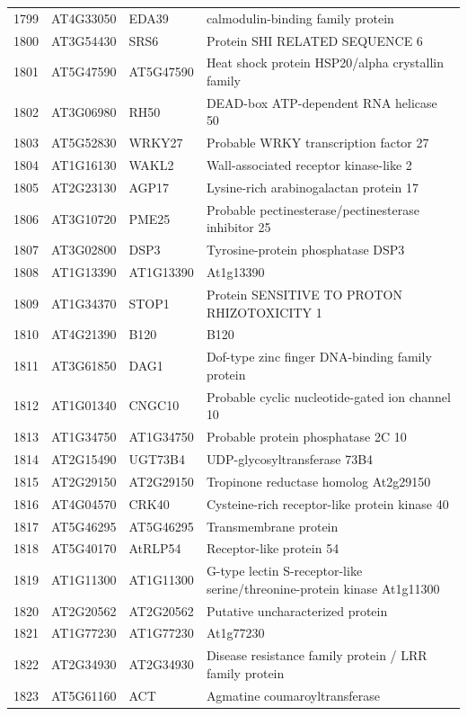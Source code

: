 \documentclass[11pt]{article}
\begin{document}
\begin{center}
\begin{tabular}{rlll}
1799 & AT4G33050 & EDA39 & calmodulin-binding family protein\\
1800 & AT3G54430 & SRS6 & Protein SHI RELATED SEQUENCE 6\\
1801 & AT5G47590 & AT5G47590 & Heat shock protein HSP20/alpha crystallin family\\
1802 & AT3G06980 & RH50 & DEAD-box ATP-dependent RNA helicase 50\\
1803 & AT5G52830 & WRKY27 & Probable WRKY transcription factor 27\\
1804 & AT1G16130 & WAKL2 & Wall-associated receptor kinase-like 2\\
1805 & AT2G23130 & AGP17 & Lysine-rich arabinogalactan protein 17\\
1806 & AT3G10720 & PME25 & Probable pectinesterase/pectinesterase inhibitor 25\\
1807 & AT3G02800 & DSP3 & Tyrosine-protein phosphatase DSP3\\
1808 & AT1G13390 & AT1G13390 & At1g13390\\
1809 & AT1G34370 & STOP1 & Protein SENSITIVE TO PROTON RHIZOTOXICITY 1\\
1810 & AT4G21390 & B120 & B120\\
1811 & AT3G61850 & DAG1 & Dof-type zinc finger DNA-binding family protein\\
1812 & AT1G01340 & CNGC10 & Probable cyclic nucleotide-gated ion channel 10\\
1813 & AT1G34750 & AT1G34750 & Probable protein phosphatase 2C 10\\
1814 & AT2G15490 & UGT73B4 & UDP-glycosyltransferase 73B4\\
1815 & AT2G29150 & AT2G29150 & Tropinone reductase homolog At2g29150\\
1816 & AT4G04570 & CRK40 & Cysteine-rich receptor-like protein kinase 40\\
1817 & AT5G46295 & AT5G46295 & Transmembrane protein\\
1818 & AT5G40170 & AtRLP54 & Receptor-like protein 54\\
1819 & AT1G11300 & AT1G11300 & G-type lectin S-receptor-like serine/threonine-protein kinase At1g11300\\
1820 & AT2G20562 & AT2G20562 & Putative uncharacterized protein\\
1821 & AT1G77230 & AT1G77230 & At1g77230\\
1822 & AT2G34930 & AT2G34930 & Disease resistance family protein / LRR family protein\\
1823 & AT5G61160 & ACT & Agmatine coumaroyltransferase\\

\end{tabular}
\end{center}
\end{document}
